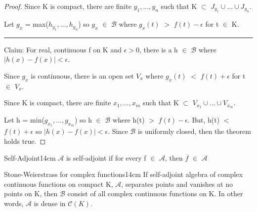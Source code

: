 \begin{proof}
        Since K is compact, there are finite $y_1,...,y_n$ such that
        K $\subset$ $J_{y_1} \cup ... \cup J_{y_n}$.

        Let $g_x$ = max($h_{y_1},...,h_{y_n}$) so $g_x$ $\in$ $\mathscr{B}$
        where $g_x(t)$ $>$ $f(t) - \epsilon$ for t $\in$ K.

        \rule[0.1cm]{15.3cm}{0.01cm}

        Claim: For real, continuous f on K and  $\epsilon > 0$, there is
        a h $\in$ $\mathscr{B}$ where $|h(x) - f(x)| < \epsilon$.

        Since $g_x$ is continuous, there is an open set $V_x$ where
        $g_x(t)$ $<$ $f(t) + \epsilon$ for t $\in$ $V_x$.

        Since K is compact, there are finite $x_1,...,x_m$ such that
        K $\subset$ $V_{x_1} \cup ... \cup V_{x_m}$.

        Let h = min($g_{x_1},...,g_{x_m}$) so h $\in$ $\mathscr{B}$
        where h(t) $>$ $f(t) - \epsilon$.
        But, h(t) $<$ $f(t) + \epsilon$ so
        $|h(x) - f(x)| < \epsilon$.
        Since $\mathscr{B}$ is uniformly closed, then the theorem holds true.
    \end{proof}

    \newpage



    \begin{definition}{Self-Adjoint}{14cm}
        $\mathscr{A}$ is self-adjoint if
        for every f $\in$ $\mathscr{A}$, then $\overline{f}$ $\in$ $\mathscr{A}$
    \end{definition}

    \vspace{0.5cm}



    \begin{wtheorem}{Stone-Weierstrass for complex functions}{14cm}
        If self-adjoint algebra of complex continuous functions on compact K,
        $\mathscr{A}$, separates points and vanishes at no points on K, then
        $\mathscr{B}$ consist of all complex continuous functions on K.
        In other words, $\mathscr{A}$ is dense in $\mathscr{C}(K)$.
    \end{wtheorem}

